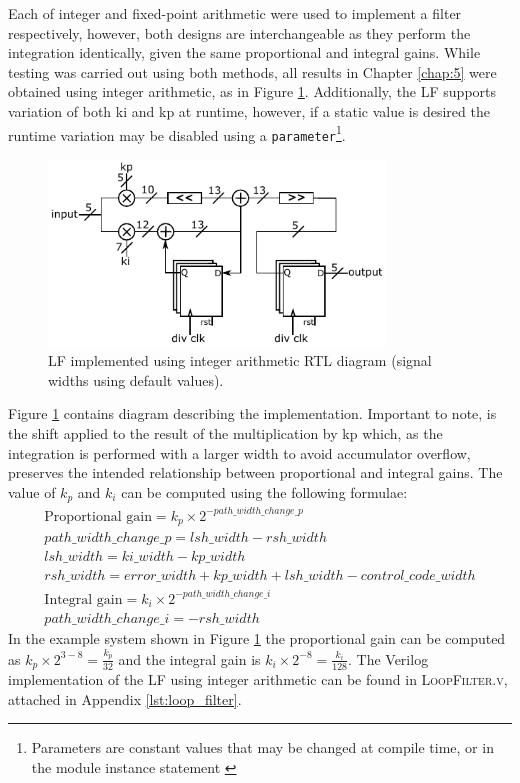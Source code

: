 Each of integer and fixed-point arithmetic were used to implement a filter respectively, however, both designs are interchangeable as they perform the integration identically, given the same proportional and integral gains. While testing was carried out using both methods, all results in Chapter \ref{chap:5} were obtained using integer arithmetic, as in Figure \ref{fig:integer_lf}. Additionally, the \ac{LF} supports variation of both \acs{ki} and \acs{kp} at runtime, however, if a static value is desired the runtime variation may be disabled using a \texttt{parameter}\footnote{Parameters are constant values that may be changed at compile time, or in the module instance statement \cite{hdlworks2}}.
\begin{figure}[h]%
    \centering
    \includegraphics[width=0.8\textwidth]{../integer_lf} 
    \caption[\acl{LF} implemented using integer arithmetic \ac{RTL} diagram]{\acl{LF} implemented using integer arithmetic \ac{RTL} diagram (signal widths using default values).}
    \label{fig:integer_lf}
\end{figure}

Figure \ref{fig:integer_lf} contains  diagram describing the implementation. Important to note, is the shift applied to the result of the multiplication by \acs{kp} which, as the integration is performed with a larger width to avoid accumulator overflow, preserves the intended relationship between proportional and integral gains. The value of $k_p$ and $k_i$ can be computed using the following formulae:
\begin{gather}
\text{Proportional gain} = k_p\times 2^{-path\_width\_change\_p} \\
path\_width\_change\_p = lsh\_width - rsh\_width \\
lsh\_width = ki\_width - kp\_width  \\
rsh\_width = error\_width + kp\_width + lsh\_width - control\_code\_width \\
\text{Integral gain} = k_i\times 2^{-path\_width\_change\_i} \\
path\_width\_change\_i = - rsh\_width
\end{gather}
In the example system shown in Figure \ref{fig:integer_lf} the proportional gain can be computed as $k_p\times 2^{3-8} = \frac{k_p}{32}$ and the integral gain is $k_i\times 2^{-8} = \frac{k_i}{128}$.
The Verilog implementation of the \ac{LF} using integer arithmetic can be found in \textsc{LoopFilter.v}, attached in Appendix \ref{lst:loop_filter}.

